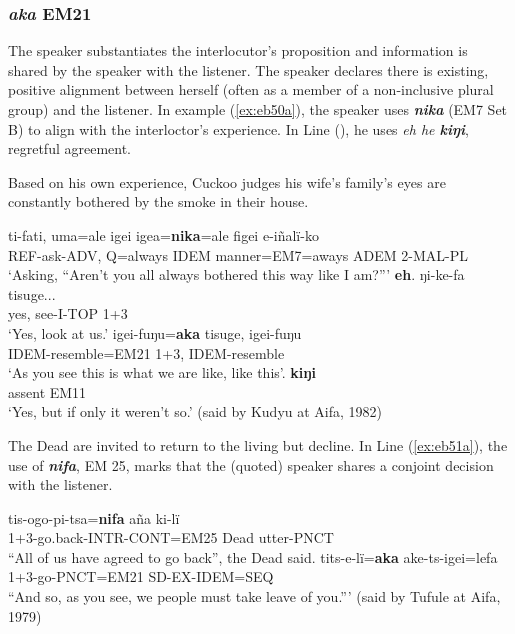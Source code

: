 \documentclass[output=paper]{langsci/langscibook}
\begin{document}
\subsubsection{\textit{aka} EM21} The speaker substantiates the interlocutor’s  proposition and information is shared by the speaker with the listener.  The speaker declares there is existing, positive alignment between herself (often as a member of a non-inclusive plural group) and the listener.  In example (\ref{ex:eb50a}), the speaker uses \textbf{\textit{nika}} (EM7 Set B) to align with the interloctor’s experience.
In Line (\label{ex:eb50d}), he uses \textit{eh he \textbf{kiŋi}}, regretful agreement.

Based on his  own experience, Cuckoo judges his wife’s family’s eyes are constantly bothered by the smoke in their house. 

\begin{exe}
\ex \label{ex:eb50}
	\begin{xlist}
	\ex \label{ex:eb50a}
	\gll ti-fati, uma=ale igei igea=\textbf{nika}=ale figei e-iñalï-ko\\
	REF-ask-ADV, Q=always IDEM manner=EM7=aways ADEM 2-MAL-PL\\
	\trans ‘Asking,  “Aren’t you all always bothered this way like I am?”’
	\ex \label{ex:eb50b}
	\gll \textbf{eh}. ŋi-ke-fa tisuge...\\
	yes, see-I-TOP 1+3\\
	\trans ‘Yes, look at us.’
	\ex \label{ex:eb50c}
	\gll igei-fuŋu=\textbf{aka} tisuge, igei-fuŋu\\
	IDEM-resemble=EM21 1+3, IDEM-resemble\\
	\trans ‘As you see this is what we are like, like this’. 
	\ex \label{ex:eb50d}
	 \textbf{kiŋi}\\
	assent EM11\\
	\trans ‘Yes, but if only it weren’t so.’ (said by Kudyu at Aifa, 1982)
\end{xlist}
\end{exe}

The Dead are invited to return to the living but decline. In Line (\ref{ex:eb51a}), the  use of \textbf{\textit{nifa}}, EM 25, marks that the (quoted) speaker shares a conjoint decision  with the listener.

\begin{exe}
\ex \label{ex:eb51}
	\begin{xlist}
	\ex \label{ex:eb51a}
	\gll tis-ogo-pi-tsa=\textbf{nifa} aña ki-lï\\
	1+3-go.back-INTR-CONT=EM25 Dead utter-PNCT\\
	\trans “All of us have agreed to go back”, the Dead said.
	\ex \label{ex:eb51b}
	\gll tits-e-lï=\textbf{aka} ake-ts-igei=lefa\\
	1+3-go-PNCT=EM21 SD-EX-IDEM=SEQ\\
	\trans “And so, as you see, we people must take leave of you.”’ (said by Tufule at Aifa, 1979)
\end{xlist}
\end{exe}
\end{document}
